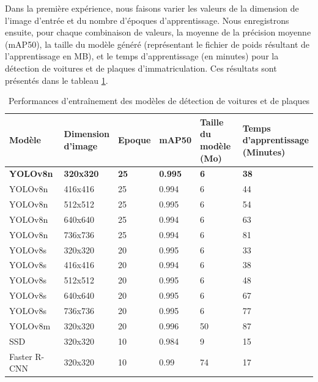 Dans la première expérience, nous faisons varier les valeurs de la dimension de l'image d'entrée et du nombre d'époques d'apprentissage. Nous enregistrons ensuite, pour chaque combinaison de valeurs, la moyenne de la précision moyenne (mAP50), la taille du modèle généré (représentant le fichier de poids résultant de l'apprentissage en MB), et le temps d'apprentissage (en minutes) pour la détection de voitures et de plaques d'immatriculation. Ces résultats sont présentés dans le tableau \ref{table:ch4-training_car_allmodels}.

\begin{table}[h]
	\centering
    \begin{tabular}{|l|l|l|l|l|l|}
    \hline
        Modèle & \shortstack{Dimension \\ d'image}  & Epoque &    mAP50 & \shortstack{Taille \\du modèle \\(Mo)}   & \shortstack{Temps\\ d'apprentissage \\ (Minutes)} \\ \hline
        \textbf{YOLOv8n} & \textbf{320x320} &      \textbf{25}     & \textbf{0.995} &  \textbf{6} &      \textbf{38}    \\ \hline
        YOLOv8n &  416x416 &     25     & 0.994  & 6 &     44    \\ \hline
        YOLOv8n & 512x512  &     25    & 0.995   &  6 &  54     \\ \hline
        YOLOv8n & 640x640 &      25     &  0.994    &  6 &   63   \\ \hline
        YOLOv8n & 736x736 &      25     &  0.994  &  6 &       81    \\ \hline
        YOLOv8s & 320x320 &      20      & 0.995  &   6 &     33     \\ \hline
        YOLOv8s & 416x416&       20      & 0.994 &  6 &      38    \\ \hline
        YOLOv8s & 512x512 &       20     &   0.995  &     6 &      48   \\ \hline
        YOLOv8s &  640x640&        20     &  0.995 & 6 &      67     \\ \hline
        YOLOv8s & 736x736  &       20     &   0.995 &   6 &       77   \\ \hline
        YOLOv8m & 320x320  &        20   &  0.996  & 50 &     87     \\ \hline
        SSD     & 320x320  &         10   &  0.984    &   9  &   15   \\ \hline
        Faster R-CNN & 320x320   &   10    &  0.99  &  74 &  17     \\ \hline
    \end{tabular}
    \caption{Performances d'entraînement des modèles de détection de voitures et de plaques}
    \label{table:ch4-training_car_allmodels}
\end{table}
